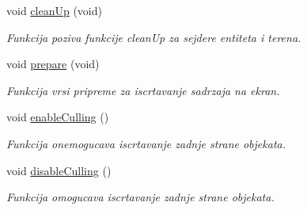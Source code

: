 \begin{DoxyCompactItemize}
void \hyperlink{classcore_1_1MainRenderer_af55caf59bc4f10718a18ecb3e784b778}{clean\+Up} (void)
\begin{DoxyCompactList}\small\item\em Funkcija poziva funkcije clean\+Up za sejdere entiteta i terena. \end{DoxyCompactList}\item 
void \hyperlink{classcore_1_1MainRenderer_a8e8be03c3b1f51ce0721cf52aa8f0f3c}{prepare} (void)
\begin{DoxyCompactList}\small\item\em Funkcija vrsi pripreme za iscrtavanje sadrzaja na ekran. \end{DoxyCompactList}\item 
void \hyperlink{classcore_1_1MainRenderer_abf659aace3015f29db1c3ea9561fff2f}{enable\+Culling} ()
\begin{DoxyCompactList}\small\item\em Funkcija onemogucava iscrtavanje zadnje strane objekata. \end{DoxyCompactList}\item 
void \hyperlink{classcore_1_1MainRenderer_a00a3d49faabb02f0984f521208681ac4}{disable\+Culling} ()
\begin{DoxyCompactList}\small\item\em Funkcija omogucava iscrtavanje zadnje strane objekata. \end{DoxyCompactList}\end{DoxyCompactItemize}
